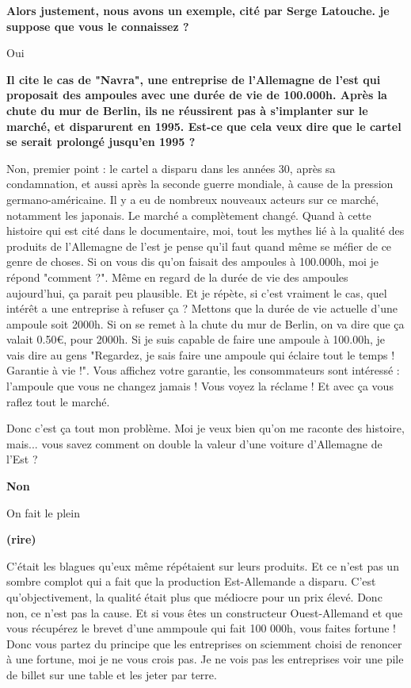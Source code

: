 \begin{small}
\textbf{Alors justement, nous avons un exemple, cité par Serge Latouche. je suppose que vous le connaissez ?}
\smallbreak


Oui

\textbf{Il cite le cas de "Navra", une entreprise de l'Allemagne de l'est qui proposait des ampoules avec une durée de vie de 100.000h. Après la chute du mur de Berlin, ils ne réussirent pas à s'implanter sur le marché, et disparurent en 1995. Est-ce que cela veux dire que le cartel se serait prolongé jusqu'en 1995 ?}
\smallbreak


Non, premier point : le cartel a disparu dans les années 30, après sa condamnation, et aussi après la seconde guerre mondiale, à cause de la pression germano-américaine. Il y a eu de nombreux nouveaux acteurs sur ce marché, notamment les japonais. Le marché a complètement changé.
Quand à cette histoire qui est cité dans le documentaire, moi, tout les mythes lié à la qualité des produits de l'Allemagne de l'est  je pense qu'il faut quand même se méfier de ce genre de choses.
Si on vous dis qu'on faisait des ampoules à 100.000h, moi je répond "comment ?". Même en regard de la durée de vie des ampoules aujourd’hui, ça parait peu plausible.
Et je répète, si c'est vraiment le cas, quel intérêt a une entreprise à refuser ça ?
Mettons que la durée de vie actuelle d'une ampoule soit 2000h. Si on se remet à la chute du mur de Berlin, on va dire que ça valait 0.50\euro, pour 2000h.
Si je suis capable de faire une ampoule à 100.00h, je vais dire au gens "Regardez, je sais faire une ampoule qui éclaire tout le temps ! Garantie à vie !". Vous affichez votre garantie, les consommateurs sont intéressé : l'ampoule que vous ne changez jamais ! Vous voyez la réclame !
Et avec ça vous raflez tout le marché.

Donc c'est ça tout mon problème. Moi je veux bien qu'on me raconte des histoire, mais... vous savez comment on double la valeur d'une voiture d'Allemagne de l'Est ?

\textbf{Non}
\smallbreak


On fait le plein

\textbf{(rire) }
\smallbreak


C'était les blagues qu'eux même répétaient sur leurs produits. Et ce n'est pas un sombre complot qui a fait que la production Est-Allemande a disparu. C'est qu'objectivement, la qualité était plus que médiocre pour un prix élevé. Donc non, ce n'est pas la cause. Et si vous êtes un constructeur Ouest-Allemand et que vous récupérez le brevet d'une ammpoule qui fait 100 000h, vous faites fortune !
Donc vous partez du principe que les entreprises on sciemment choisi de renoncer à une fortune, moi je ne vous crois pas. Je ne vois pas les entreprises voir une pile de billet sur une table et les jeter par terre.


\end{small}

